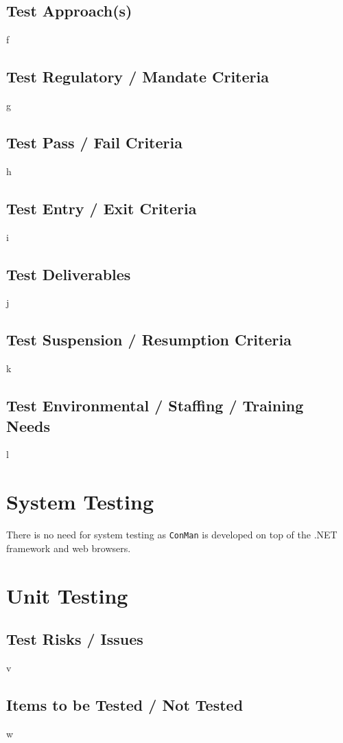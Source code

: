 \documentclass{article}
\begin{document}
\subsection{Test Approach(s)}
f

\subsection{Test Regulatory / Mandate Criteria}
g

\subsection{Test Pass / Fail Criteria}
h

\subsection{Test Entry / Exit Criteria}
i

\subsection{Test Deliverables}
j

\subsection{Test Suspension / Resumption Criteria}
k

\subsection{Test Environmental / Staffing / Training Needs}
l

\section{System Testing}
There is no need for system testing as \texttt{ConMan} is developed on top 
of the .NET framework and web browsers.

\newpage
\section{Unit Testing}
\subsection{Test Risks / Issues}
v

\subsection{Items to be Tested / Not Tested}
w
\end{document}
